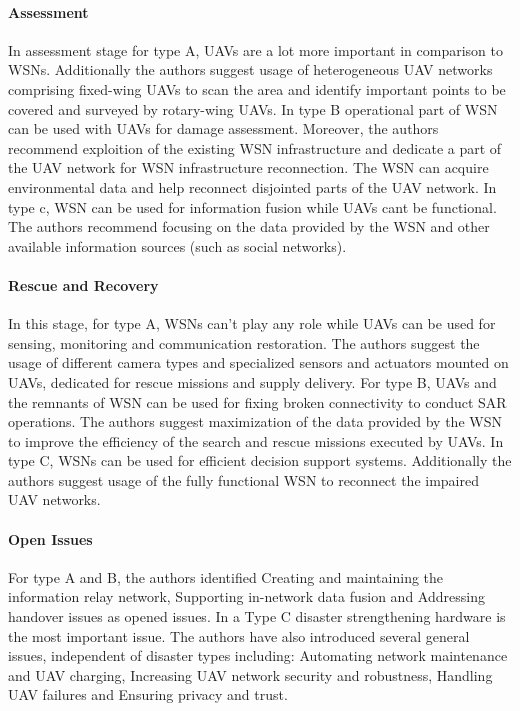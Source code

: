 \documentclass{article}
\begin{document}
	
	\paragraph{Assessment} In assessment stage  for type A, UAVs are a lot more important in comparison to WSNs. Additionally the authors suggest usage of heterogeneous UAV networks
	comprising fixed-wing UAVs to scan
	the area and identify important
	points to be covered and surveyed by
	rotary-wing UAVs. In type B operational part of WSN can be used with UAVs for damage assessment. Moreover, the authors recommend exploition of the existing WSN infrastructure
	and dedicate a part of the UAV network
	for WSN infrastructure reconnection.
	The WSN can acquire environmental
	data and help reconnect disjointed
	parts of the UAV network. In type c, WSN can be used for information fusion while UAVs cant be functional. The authors recommend focusing on the data provided by the
	WSN and other available information
	sources (such as social networks).
	
	\paragraph{Rescue and Recovery} In this stage, for type A, WSNs can't play any role while UAVs can be used for sensing, monitoring and communication restoration. The authors suggest the usage of different camera types and
	specialized sensors and actuators
	mounted on UAVs, dedicated for
	rescue missions and supply delivery. For type B, UAVs and the remnants of WSN can be used for fixing broken connectivity to conduct SAR operations. The authors suggest maximization of the data provided by
	the WSN to improve the efficiency
	of the search and rescue missions
	executed by UAVs.
	In type C, WSNs can be used for efficient decision support systems. Additionally the authors suggest usage of the fully functional WSN to
	reconnect the impaired UAV
	networks.
	
	\paragraph{Open Issues}
	For type A and B, the authors identified Creating and maintaining the information relay network, Supporting in-network data fusion and Addressing handover issues as opened issues. In a Type C  disaster strengthening hardware is the most important issue. The authors have also introduced several general issues, independent of disaster types including: Automating network maintenance and UAV charging, Increasing UAV network security and robustness, Handling UAV failures and Ensuring privacy and trust.  
	
	
\end{document}
